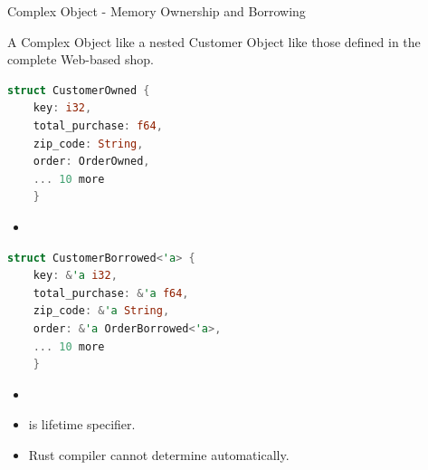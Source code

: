 \documentclass[9pt]{beamer}
\begin{document}
\begin{frame}[fragile]{Complex Object - Memory Ownership and Borrowing}

A Complex Object like a nested Customer Object like those defined in the complete Web-based shop. 
 
\begin{minipage}{0.5\linewidth}
\centering
\begin{lstlisting}[language=Rust]
struct CustomerOwned {
    key: i32,
    total_purchase: f64,
    zip_code: String,
    order: OrderOwned,
    ... 10 more
    }
\end{lstlisting}
\end{minipage}\hfill  
\begin{minipage}{0.5\linewidth}
\centering
\begin{itemize}
    \item {} 
\end{itemize}
\end{minipage}

\begin{minipage}{0.5\linewidth}
\centering
\begin{lstlisting}[language=Rust]
struct CustomerBorrowed<'a> {
    key: &'a i32,
    total_purchase: &'a f64,
    zip_code: &'a String,
    order: &'a OrderBorrowed<'a>,
    ... 10 more 
    }
\end{lstlisting}
\end{minipage}\hfill  
\begin{minipage}{0.5\linewidth}
\centering
\begin{itemize}
    \item {}
    \item {} is lifetime specifier.
    \item Rust compiler cannot determine  automatically.
\end{itemize}
\end{minipage}
\end{frame}
\end{document}
